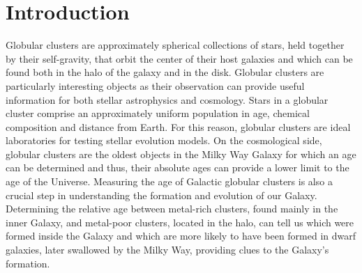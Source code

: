 \documentclass[useAMS,usenatbib]{mnras}
\begin{document}
\section{Introduction}
\label{sec:introduction}

Globular clusters are approximately spherical collections of stars, held together by their self-gravity, that orbit the center of their host galaxies and which can be found both in the halo of the galaxy and in the disk.  Globular clusters are particularly interesting objects as their observation can provide useful information for both stellar astrophysics and cosmology. Stars in a globular cluster comprise an approximately uniform population in age, chemical composition and distance from Earth. For this reason, globular clusters are ideal laboratories for testing stellar evolution models. On the cosmological side, globular clusters are the oldest objects in the Milky Way Galaxy for which an age can be determined and thus, their absolute ages can provide a lower limit to the age of the Universe. Measuring the age of Galactic globular clusters is also a crucial step in understanding the formation and evolution of our Galaxy. Determining the relative age between metal-rich clusters, found mainly in the inner Galaxy, and metal-poor clusters, located in the halo, can tell us which were formed inside the Galaxy and which are more likely to have been formed in dwarf galaxies, later swallowed by the Milky Way, providing clues to the Galaxy's formation. 
\end{document}
